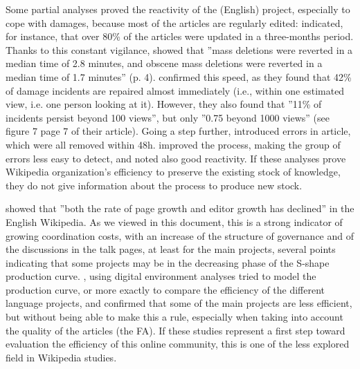 Some partial analyses proved the reactivity of the (English) project,
especially to cope with damages, because most of the articles are
regularly edited: \citet{Burioletal06} indicated, for instance, that
over 80\% of the articles were updated in a three-months period. Thanks
to this constant vigilance, \citet{Viegasetal07} showed that ''mass
deletions were reverted in a median time of 2.8 minutes, and obscene
mass deletions were reverted in a median time of 1.7 minutes'' (p.
4). \citet{Priedhorskyetal07} confirmed this speed, as they found
that 42\% of damage incidents are repaired almost immediately (i.e.,
within one estimated view, i.e. one person looking at it). However,
they also found that ''11\% of incidents persist beyond 100 views'',
but only ''0.75 \textendash{} beyond 1000 views'' (see figure 7
page 7 of their article). Going a step further, \citet{Halavais04}
introduced errors in article, which were all removed within 48h. \citet{Magnus08}
improved the process, making the group of errors less easy to detect,
and noted also good reactivity. If these analyses prove Wikipedia
organization's efficiency to preserve the existing stock of knowledge,
they do not give information about the process to produce new stock. 

\citet{Suhetal09} showed that ''both the rate of page growth and
editor growth has declined'' in the English Wikipedia. As we viewed
in this document, this is a strong indicator of growing coordination
costs, with an increase of the structure of governance and of the
discussions in the talk pages, at least for the main projects, several
points indicating that some projects may be in the decreasing phase
of the S-shape production curve. \citet{CrowstonJullienOrtega13},
using digital environment analyses tried to model the production curve,
or more exactly to compare the efficiency of the different language
projects, and confirmed that some of the main projects are less efficient,
but without being able to make this a rule, especially when taking
into account the quality of the articles (the FA). If these studies
represent a first step toward evaluation the efficiency of this online
community, this is one of the less explored field in Wikipedia studies.

